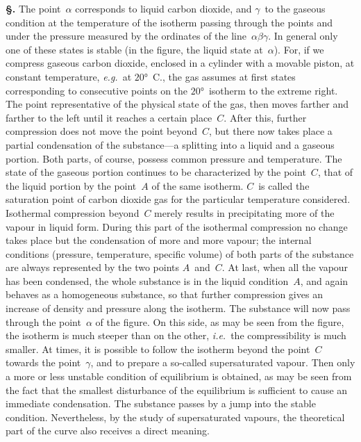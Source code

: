 \documentclass[12pt]{book}[2005/09/16]
\newcommand{\Section}[1]{
  \medskip\par\textbf{§\;#1}
  \label{section:#1}
}
\newcommand{\PageSep}[1]{\ignorespaces}
\newcommand{\eg}{\emph{e.g.}}
\newcommand{\ie}{\emph{i.e.}}
\begin{document}
\Section{27.} The point~$\alpha$ corresponds to liquid carbon dioxide,
and $\gamma$~to the gaseous condition at the temperature of the
isotherm passing through the points and under the pressure
measured by the ordinates of the line~$\alpha\beta\gamma$. In general
only one of these states is stable (in the figure, the liquid
state at~$\alpha$). For, if we compress gaseous carbon dioxide,
enclosed in a cylinder with a movable piston, at constant
temperature, \eg\ at $20°$~C., the gas assumes at first states
corresponding to consecutive points on the $20°$~isotherm to
the extreme right. The point representative of the physical
state of the gas, then moves farther and farther to the left
until it reaches a certain place~$C$. After this, further compression
does not move the point beyond~$C$, but there now
takes place a partial condensation of the substance---a splitting
into a liquid and a gaseous portion. Both parts, of course,
possess common pressure and temperature. The state of the
gaseous portion continues to be characterized by the point~$C$,
that of the liquid portion by the point~$A$ of the same
isotherm. $C$~is called the saturation point of carbon dioxide
%
gas for the particular temperature considered. Isothermal
compression beyond~$C$ merely results in precipitating more
of the vapour in liquid form. During this part of the
isothermal compression no change takes place but the condensation
of more and more vapour; the internal conditions
(pressure, temperature, specific volume) of both parts of the
substance are always represented by the two points $A$~and~$C$.
At last, when all the vapour has been condensed, the whole
substance is in the liquid condition~$A$, and again behaves
\PageSep{17}
as a homogeneous substance, so that further compression
gives an increase of density and pressure along the isotherm.
The substance will now pass through the point~$\alpha$ of the
%
figure. On this side, as may be seen from the figure, the
isotherm is much steeper than on the other, \ie\ the compressibility
is much smaller. At times, it is possible to follow the
isotherm beyond the point~$C$ towards the point~$\gamma$, and to
prepare a so-called supersaturated vapour. Then only a
more or less unstable condition of equilibrium is obtained,
as may be seen from the fact that the smallest disturbance
of the equilibrium is sufficient to cause an immediate condensation.
The substance passes by a jump into the stable
condition. Nevertheless, by the study of supersaturated
vapours, the theoretical part of the curve also receives a
direct meaning.
\end{document}
